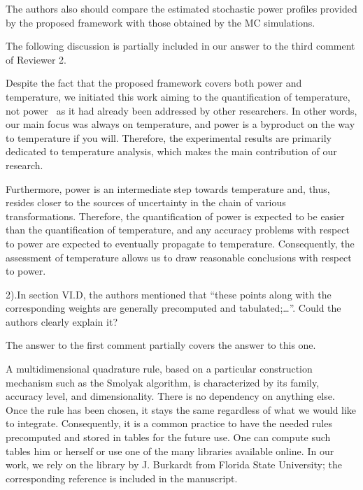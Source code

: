 \begin{reviewer}
The authors also should compare the estimated stochastic power profiles provided by the proposed framework with those obtained by the MC simulations.
\end{reviewer}
\begin{authors}
The following discussion is partially included in our answer to the third comment of Reviewer 2.

Despite the fact that the proposed framework covers both power and temperature, we initiated this work aiming to the quantification of temperature, not power \perse\ as it had already been addressed by other researchers.
In other words, our main focus was always on temperature, and power is a byproduct on the way to temperature if you will.
Therefore, the experimental results are primarily dedicated to temperature analysis, which makes the main contribution of our research.

Furthermore, power is an intermediate step towards temperature and, thus, resides closer to the sources of uncertainty in the chain of various transformations.
Therefore, the quantification of power is expected to be easier than the quantification of temperature, and any accuracy problems with respect to power are expected to eventually propagate to temperature.
Consequently, the assessment of temperature allows us to draw reasonable conclusions with respect to power.


\end{authors}

\begin{reviewer}
2).In section VI.D, the authors mentioned that ``these points along with the corresponding weights are generally precomputed and tabulated;\ldots''. Could the authors clearly explain it?
\end{reviewer}
\begin{authors}
The answer to the first comment partially covers the answer to this one.

A multidimensional quadrature rule, based on a particular construction mechanism such as the Smolyak algorithm, is characterized by its family, accuracy level, and dimensionality.
There is no dependency on anything else.
Once the rule has been chosen, it stays the same regardless of what we would like to integrate.
Consequently, it is a common practice to have the needed rules precomputed and stored in tables for the future use.
One can compute such tables him or herself or use one of the many libraries available online.
In our work, we rely on the library by J. Burkardt from Florida State University; the corresponding reference is included in the manuscript.

\end{authors}

